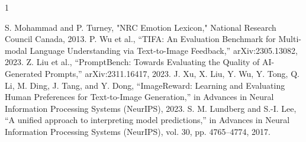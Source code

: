 \documentclass[conference]{IEEEtran}
\begin{document}

\begin{thebibliography}{1}

    S. Mohammad and P. Turney, "NRC Emotion Lexicon," National Research Council Canada, 2013.
    P. Wu et al., “TIFA: An Evaluation Benchmark for Multi-modal Language Understanding via Text-to-Image Feedback,” arXiv:2305.13082, 2023.
    Z. Liu et al., “PromptBench: Towards Evaluating the Quality of AI-Generated Prompts,” arXiv:2311.16417, 2023.
    J. Xu, X. Liu, Y. Wu, Y. Tong, Q. Li, M. Ding, J. Tang, and Y. Dong, “ImageReward: Learning and Evaluating Human Preferences for Text-to-Image Generation,” in Advances in Neural Information Processing Systems (NeurIPS), 2023.
    S. M. Lundberg and S.-I. Lee, “A unified approach to interpreting model predictions,” in Advances in Neural Information Processing Systems (NeurIPS), vol. 30, pp. 4765–4774, 2017.
    \end{thebibliography}
\end{document}
